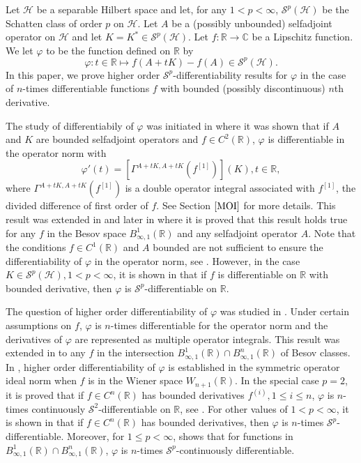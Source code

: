 \documentclass[12pt]{amsart}
\theoremstyle{remark}
\begin{document}
Let $\mathcal{H}$ be a separable Hilbert space and let, for any $1 < p < \infty$, $\mathcal{S}^p(\mathcal{H})$ be the Schatten class of order $p$ on $\mathcal{H}$.
Let $A$ be a (possibly unbounded) selfadjoint operator on $\mathcal{H}$ and let $K = K^* \in \mathcal{S}^p(\mathcal{H})$. Let $f : \mathbb{R} \to \mathbb{C}$ be a Lipschitz function. We let $\varphi$ to be the function defined on $\mathbb{R}$ by
$$
\varphi : t \in \mathbb{R} \mapsto f(A+tK) - f(A) \in \mathcal{S}^p(\mathcal{H}).
$$
In this paper, we prove higher order $\mathcal{S}^p$-differentiability results for $\varphi$ in the case of $n$-times differentiable functions $f$ with bounded (possibly discontinuous) $n$th derivative.


The study of differentiabily of $\varphi$ was initiated in \cite{DK1956} where it was shown that if $A$ and $K$ are bounded selfadjoint operators and $f \in C^2(\mathbb{R})$, $\varphi$ is differentiable in the operator norm with
$$
\varphi'(t) = \left[ \Gamma^{A+tK, A+tK}(f^{[1]}) \right](K), t\in \mathbb{R},
$$
where $\Gamma^{A+tK, A+tK}(f^{[1]})$ is a double operator integral associated with $f^{[1]}$, the divided difference of first order of $f$. See Section $\ref{MOI}$ for more details. This result was extended in \cite{BS3} and later in \cite{Peller1990} where it is proved that this result holds true for any $f$ in the Besov space $B^1_{\infty, 1}(\mathbb{R})$ and any selfadjoint operator $A$. Note that the conditions $f \in C^1(\mathbb{R})$ and $A$ bounded are not sufficient to ensure the differentiability of $\varphi$ in the operator norm, see \cite{Far}. However, in the case $K\in \mathcal{S}^p(\mathcal{H}), 1<p<\infty$, it is shown in \cite{KPSS} that if $f$ is differentiable on $\mathbb{R}$ with bounded derivative, then $\varphi$ is $\mathcal{S}^p$-differentiable on $\mathbb{R}$.

The question of higher order differentiability of $\varphi$ was studied in \cite{Stek}. Under certain assumptions on $f$, $\varphi$ is $n$-times differentiable for the operator norm and the derivatives of $\varphi$ are represented as multiple operator integrals. This result was extended in \cite{Peller2006} to any $f$ in the intersection $B^1_{\infty, 1}(\mathbb{R}) \cap B^n_{\infty, 1}(\mathbb{R})$ of Besov classes. In \cite{ACDS}, higher order differentiability of $\varphi$ is established in the symmetric operator ideal norm when $f$ is in the Wiener space $W_{n+1}(\mathbb{R})$. In the special case $p=2$, it is proved that if $f\in C^n(\mathbb{R})$ has bounded derivatives $f^{(i)}, 1\leq i\leq n$, $\varphi$ is $n$-times continuously $\mathcal{S}^2$-differentiable on $\mathbb{R}$, see \cite{CLSS}. For other values of $1 < p < \infty$, it is shown in \cite{LMS} that if $f\in C^n(\mathbb{R})$ has bounded derivatives, then $\varphi$ is $n$-times $\mathcal{S}^p$-differentiable. Moreover, for $1\leq p < \infty$, \cite[Theorem 4.1]{LMS} shows that for functions in $B^1_{\infty, 1}(\mathbb{R}) \cap B^n_{\infty, 1}(\mathbb{R})$, $\varphi$ is $n$-times $\mathcal{S}^p$-continuously differentiable.
\end{document}
